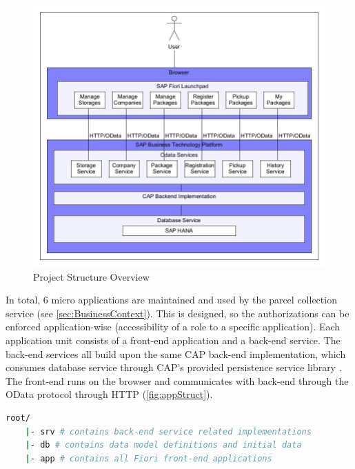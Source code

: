 \begin{figure}[!htb]
	\centering
	\includegraphics[width=1\linewidth]{images/app_struct_new.jpg}
	\caption{Project Structure Overview}
	\label{fig:appStruct}
\end{figure}

In total, 6 micro applications are maintained and used by the parcel collection service (see \autoref{sec:BusinessContext}). This is designed, so the authorizations can be enforced application-wise (accessibility of a role to a specific application). Each application unit consists of a front-end application and a back-end service.
The back-end services all build upon the same CAP back-end implementation, which consumes database service through CAP's provided persistence service library \cite{cap-java-persistencesrv}. The front-end runs on the browser and communicates with back-end through the OData protocol \cite{odata} through HTTP \cite{http} (\autoref{fig:appStruct}). 




\begin{lstlisting}[language={bash}]
root/
    |- srv # contains back-end service related implementations
    |- db # contains data model definitions and initial data
    |- app # contains all Fiori front-end applications
\end{lstlisting}

